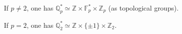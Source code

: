 If $p \neq 2$, one has $\mathbb{Q}_p^* \simeq \mathbb{Z} \times \mathbb{F}_p^* \times \mathbb{Z}_p$ (as topological groups).

If $p = 2$, one has $\mathbb{Q}_2^* \simeq \mathbb{Z} \times \{\pm 1\} \times \mathbb{Z}_2$.

